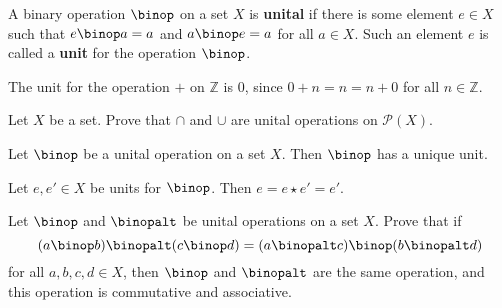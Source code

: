 \begin{example}
\todo{}
\end{example}

\begin{exercise}
\todo{}
\end{exercise}

\todo{}

\begin{definition}
\label{defUnitalOperation}
A binary operation $\binop$ on a set $X$ is \textbf{unital} if there is some element $e \in X$ such that $e \binop a = a$ and $a \binop e = a$ for all $a \in X$. Such an element $e$ is called a \textbf{unit} for the operation $\binop$.
\end{definition}

\begin{example}
The unit for the operation $+$ on $\mathbb{Z}$ is $0$, since $0 + n = n = n + 0$ for all $n \in \mathbb{Z}$.
\end{example}

\begin{exercise}
Let $X$ be a set. Prove that $\cap$ and $\cup$ are unital operations on $\mathcal{P}(X)$.
\end{exercise}

\begin{proposition}
Let $\binop$ be a unital operation on a set $X$. Then $\binop$ has a unique unit.
\end{proposition}

\begin{cproof}
Let $e, e' \in X$ be units for $\binop$. Then $e = e \star e' = e'$.
\end{cproof}

\todo{}

\begin{exercise}
Let $\binop$ and $\binopalt$ be unital operations on a set $X$. Prove that if
\[ (a \binop b) \binopalt (c \binop d) = (a \binopalt c) \binop (b \binopalt d) \]
for all $a,b,c,d \in X$, then $\binop$ and $\binopalt$ are the same operation, and this operation is commutative and associative.
\end{exercise}

\begin{example}
\todo{}
\end{example}

